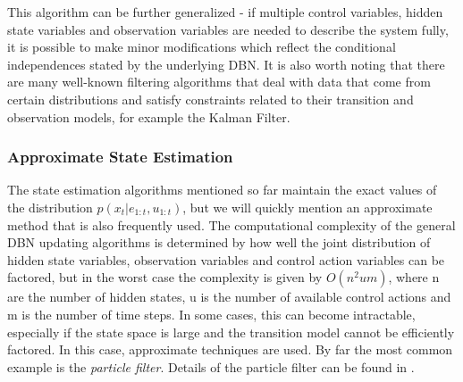 


This algorithm can be further generalized - if multiple control variables, hidden state variables and observation variables are needed to describe the system fully, it is possible to make minor modifications which reflect the conditional independences stated by the underlying DBN. It is also worth noting that there are many well-known filtering algorithms that deal with data that come from certain distributions and satisfy constraints related to their transition and observation models, for example the Kalman Filter.







\subsubsection{Approximate State Estimation}
The state estimation algorithms mentioned so far maintain the exact values of the distribution $p(x_t | e_{1:t}, u_{1:t})$, but we will quickly mention an approximate method that is also frequently used. The computational complexity of the general DBN updating algorithms is determined by how well the joint distribution of hidden state variables, observation variables and control action variables can be factored, but in the worst case the complexity is given by $O(n^2um)$, where n are the number of hidden states, u is the number of available control actions and m is the number of time steps. In some cases, this can become intractable, especially if the state space is large and the transition model cannot be efficiently factored. In this case, approximate techniques are used. By far the most common example is the \textit{particle filter}. Details of the particle filter can be found in \cite{Thrun:2005:ProbabilisticRobotics}.
